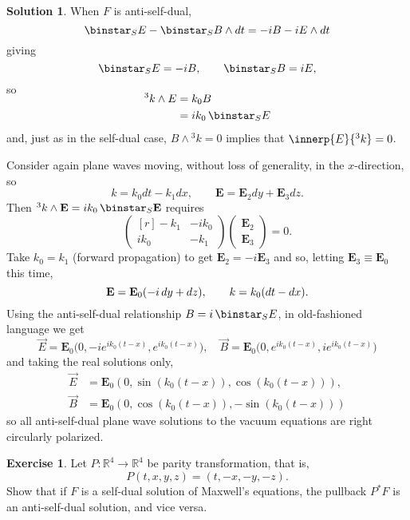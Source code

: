 \documentclass[11pt, a4paper]{report}
\theoremstyle{definition}
\newtheorem{exercise}{Exercise}[part]
\newtheorem{solution}{Solution}[part]
\newenvironment{ex}{\begin{exercise}}{\end{exercise}\pagebreak[1]}
\newenvironment{sol}{\begin{solution}}{\end{solution}\pagebreak[3]}
\renewcommand*{\d}{\ensuremath\mathop{}\mathopen{}d}
\renewcommand*{\star}{\ensuremath\mathop{}\mathopen\binstar\mathord{}}
\begin{document}
\begin{sol}
When $F$ is anti-self-dual,
\[
    \star_S E - \star_S B \wedge dt = -iB - iE \wedge dt
\]
giving
\[
    \star_S E = -i B, \qquad
    \star_S B = iE,
\]
so
\begin{align*}
    \SwapAboveDisplaySkip
    ^3k \wedge E &= k_0 B \\
                 &= ik_0 \star_S E
\end{align*}
and, just as in the self-dual case, $B \wedge {}^3 k = 0$ implies that $\innerp{E}{^3k} = 0$.

Consider again plane waves moving, without loss of generality, in the $x$-direction, so
\[
    k = k_0 dt - k_1 dx, \qquad
    \mathbf{E} = \mathbf{E}_2 dy + \mathbf{E}_3 dz.
\]
Then $^3k \wedge \mathbf{E} = ik_0 \star_S \mathbf{E}$ requires
\[
    \begin{pmatrix*}[r]
        -k_1  & -ik_0 \\
        ik_0 & -k_1
    \end{pmatrix*}
    \begin{pmatrix}
        \mathbf{E}_2 \\ \mathbf{E}_3
    \end{pmatrix}
    = 0.
\]
Take $k_0 = k_1$ (forward propagation) to get $\mathbf{E}_2 = -i \mathbf{E}_3$ and so, letting $\mathbf{E}_3 \equiv \mathbf{E}_0$ this time,
\[
    \mathbf{E} = \mathbf{E}_0 (-i \d y + dz), \qquad
    k = k_0 (dt - dx).
\]
Using the anti-self-dual relationship $B = i \star_S E$, in old-fashioned language we get
\[
    \vec{E} = \mathbf{E}_0 \bigl( 0, -ie^{ik_0 (t - x)}, e^{ik_0 (t - x)} \bigr), \quad
    \vec{B} = \mathbf{E}_0 \bigl( 0, e^{ik_0 (t - x)}, ie^{ik_0 (t - x)} \bigr)
\]
and taking the real solutions only,
\begin{align*}
    \vec{E} &= \mathbf{E}_0 (0, \sin(k_0 (t - x)), \cos(k_0 (t - x))), \\
    \vec{B} &= \mathbf{E}_0 (0, \cos(k_0 (t - x)), -\sin(k_0 (t - x)))
\end{align*}
so all anti-self-dual plane wave solutions to the vacuum equations are right circularly polarized.

\end{sol}

\begin{ex}

Let $P: \mathbb{R}^4 \to \mathbb{R}^4$ be parity transformation, that is,
\[
    P(t, x, y, z) = (t, -x, -y, -z).
\]
Show that if $F$ is a self-dual solution of Maxwell's equations, the pullback $P^* F$ is an anti-self-dual solution, and vice versa.

\end{ex}
\end{document}
